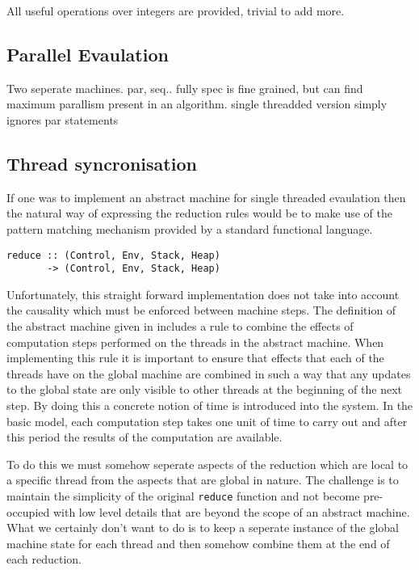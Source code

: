 \documentclass{llncs}
\begin{document}
All useful operations over integers are provided, trivial to add more. 




\subsection{Parallel Evaulation}
Two seperate machines. par, seq.. fully spec is fine grained, but can find maximum parallism present in an algorithm. single threadded version simply ignores par statements




\subsection{Thread syncronisation}
If one was to implement an abstract machine for single threaded evaulation then the natural way of expressing the reduction rules would be to make use of the pattern matching mechanism provided by a standard functional language. 

\begin{verbatim}
reduce :: (Control, Env, Stack, Heap) 
       -> (Control, Env, Stack, Heap)
\end{verbatim}

Unfortunately, this straight forward implementation does not take into account the causality which must be enforced between machine steps. The definition of the abstract machine given in \cite{baker-finch:plam} includes a rule to combine the effects of computation steps performed on the threads in the abstract machine. When implementing this rule it is important to ensure that effects that each of the threads have on the global machine are combined in such a way that any updates to the global state are only visible to other threads at the beginning of the next step. By doing this a concrete notion of time is introduced into the system. In the basic model, each computation step takes one unit of time to carry out and after this period the results of the computation are available.

To do this we must somehow seperate aspects of the reduction which are local to a specific thread from the aspects that are global in nature. The challenge is to maintain the simplicity of the original \texttt{reduce} function and not become pre-occupied with low level details that are beyond the scope of an abstract machine. What we certainly don't want to do is to keep a seperate instance of the global machine state for each thread and then somehow combine them at the end of each reduction.
\end{document}
